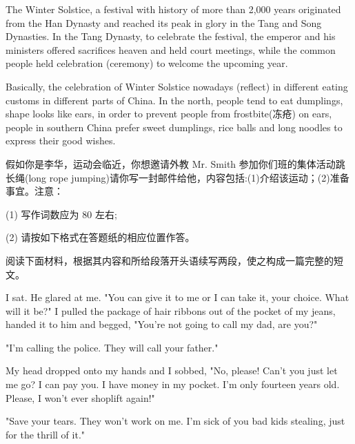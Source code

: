 \documentclass{英语试卷}
\begin{document}
\par The Winter Solstice, a festival with  history of more than 2,000 years originated from the Han Dynasty and reached its peak in glory in the Tang and Song Dynasties. In the Tang Dynasty, to celebrate the festival, the emperor and his ministers offered sacrifices  heaven and held court meetings, while the common people held celebration  (ceremony) to welcome the upcoming year.\par
\par Basically, the celebration of Winter Solstice nowadays  (reflect) in different eating customs in different parts of China. In the north, people tend to eat dumplings,  shape looks like ears, in order to prevent people from frostbite(冻疮) on ears,  people in southern China prefer sweet dumplings, rice balls and long noodles to express their good wishes.\par
{}
\par 假如你是李华，运动会临近，你想邀请外教 Mr. Smith 参加你们班的集体活动跳长绳(long rope jumping)请你写一封邮件给他，内容包括:(1)介绍该运动；(2)准备事宜。注意：\par
\par (1) 写作词数应为 80 左右;\par
\par (2) 请按如下格式在答题纸的相应位置作答。\par
{}
\par 阅读下面材料，根据其内容和所给段落开头语续写两段，使之构成一篇完整的短文。\par
\par I sat. He glared at me. "You can give it to me or I can take it, your choice. What will it be?" I pulled the package of hair ribbons out of the pocket of my jeans, handed it to him and begged, "You're not going to call my dad, are you?"\par
\par "I'm calling the police. They will call your father."\par
\par My head dropped onto my hands and I sobbed, "No, please! Can't you just let me go? I can pay you. I have money in my pocket. I'm only fourteen years old. Please, I won't ever shoplift again!"\par
\par "Save your tears. They won't work on me. I'm sick of you bad kids stealing, just for the thrill of it."\par
\end{document}
